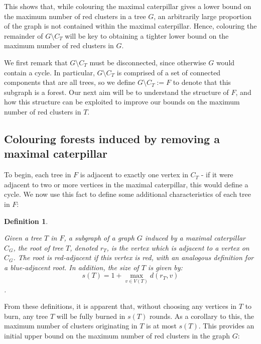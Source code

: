 \documentclass{mpaper}
\newtheorem{definition}[theorem]{Definition}
\begin{document}

This shows that, while colouring the maximal caterpillar gives a lower bound on the maximum number of red clusters in a tree $G$, an arbitrarily large proportion of the graph is not contained within the maximal caterpillar. Hence, colouring the remainder of $G \setminus C_T$ will be key to obtaining a tighter lower bound on the maximum number of red clusters in $G$.

We first remark that $G \setminus C_T$ must be disconnected, since otherwise $G$ would contain a cycle. In particular, $G \setminus C_T$ is comprised of a set of connected components that are all trees, so we define $G \setminus C_T := F$ to denote that this subgraph is a forest. Our next aim will be to understand the structure of $F$, and how this structure can be exploited to improve our bounds on the maximum number of red clusters in $T$.

\subsection{Colouring forests induced by removing a maximal caterpillar}
\label{sub/colouring_forests}
\vspace{1em}

To begin, each tree in $F$ is adjacent to exactly one vertex in $C_T$ - if it were adjacent to two or more vertices in the maximal caterpillar, this would define a cycle. We now use this fact to define some additional characteristics of each tree in $F$:

\begin{definition}
\label{def/roots}

Given a tree $T$ in $F$, a subgraph of a graph $G$ induced by a maximal caterpillar $C_G$, the \emph{root} of tree $T$, denoted $r_T$, is the vertex which is adjacent to a vertex on $C_G$. The root is \emph{red-adjacent} if this vertex is red, with an analogous definition for a \emph{blue-adjacent} root. In addition, the \emph{size} of $T$ is given by: $$s(T) = 1 + \max_{v \in V(T)} d(r_{T},v)$$.
 
\end{definition}
From these definitions, it is apparent that, without choosing any vertices in $T$ to burn, any tree $T$ will be fully burned in $s(T)$ rounds. As a corollary to this, the maximum number of clusters originating in $T$ is at most $s(T)$. This provides an initial upper bound on the maximum number of red clusters in the graph $G$:
\end{document}

